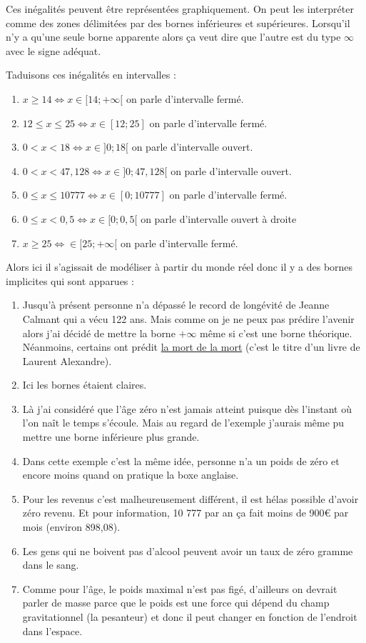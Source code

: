 \documentclass[11pt]{article}
\begin{document}
Ces inégalités peuvent être représentées graphiquement. On peut les
interpréter comme des zones délimitées par des bornes inférieures
et supérieures. Lorsqu'il n'y a qu'une seule borne apparente alors
ça veut dire que l'autre est du type \(\infty\) avec le signe
adéquat.

Taduisons ces inégalités en intervalles :

\begin{enumerate}
\item \(x \geq 14 \iff x\in [14; +\infty [\) on parle d'intervalle fermé.
\item \(12 \leq x \leq 25\iff x\in [12; 25]\) on parle d'intervalle fermé.
\item \(0 < x < 18\iff x\in ]0; 18[\) on parle d'intervalle ouvert.
\item \(0 < x < 47,128\iff x\in ]0; 47,128[\) on parle d'intervalle
ouvert.
\item \(0\leq x \leq 10 777\iff x\in [0; 10777]\) on parle d'intervalle
fermé.
\item \(0 \leq x < 0,5\iff x\in [0; 0,5[\) on parle d'intervalle ouvert à droite
\item \(x \geq 25\iff \in [25; +\infty[\) on parle d'intervalle fermé.
\end{enumerate}


Alors ici il s'agissait de modéliser à partir du monde réel donc il
y a des bornes implicites qui sont apparues :
\begin{enumerate}
\item Jusqu'à présent personne n'a dépassé le record de longévité de
Jeanne Calmant qui a vécu 122 ans. Mais comme on je ne peux pas
prédire l'avenir alors j'ai décidé de mettre la borne \(+\infty\)
même si c'est une borne théorique. Néanmoins, certains ont
prédit \href{https://amzn.to/3OKi2os}{la mort de la mort} (c'est le titre d'un livre de Laurent
Alexandre).
\item Ici les bornes étaient claires.
\item Là j'ai considéré que l'âge zéro n'est jamais atteint puisque
dès l'instant où l'on naît le temps s'écoule. Mais au regard de
l'exemple j'aurais même pu mettre une borne inférieure plus
grande.
\item Dans cette exemple c'est la même idée, personne n'a un poids de
zéro et encore moins quand on pratique la boxe anglaise.
\item Pour les revenus c'est malheureusement différent, il est hélas
possible d'avoir zéro revenu. Et pour information, 10 777 par an
ça fait moins de 900€ par mois (environ 898,08).
\item Les gens qui ne boivent pas d'alcool peuvent avoir un taux de
zéro gramme dans le sang.
\item Comme pour l'âge, le poids maximal n'est pas figé, d'ailleurs on
devrait parler de masse parce que le poids est une force qui
dépend du champ gravitationnel (la pesanteur) et donc il peut
changer en fonction de l'endroit dans l'espace.
\end{enumerate}
\end{document}
